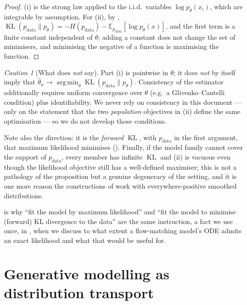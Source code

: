 \documentclass[11pt,a4paper]{report}
\theoremstyle{definition}
\theoremstyle{remark}
\newtheorem{caution}[caution]{Caution}
\DeclareMathOperator*{\argmin}{arg\,min}
\DeclareMathOperator{\KL}{KL}
\newcommand{\EE}{\mathbb E}
\begin{document}
\begin{proof}
(i) is the strong law applied to the i.i.d.\ variables $\log p_\theta(x_i)$,
which are integrable by assumption. For (ii), by
,
$\KL(p_{\mathrm{data}}\|p_\theta) = -H(p_{\mathrm{data}}) - \EE_{p_{\mathrm{data}}}[\log p_\theta(x)]$,
and the first term is a finite constant independent of $\theta$; adding a
constant does not change the set of minimisers, and minimising the negative
of a function is maximising the function.
\end{proof}

\begin{caution}[What  does \emph{not} say]
\label{caution:mle-scope}
Part (i) is pointwise in $\theta$; it does \emph{not} by itself imply that
$\hat\theta_n\to\argmin_\theta\KL(p_{\mathrm{data}}\|p_\theta)$. Consistency
of the estimator additionally requires uniform convergence over $\theta$
(e.g.\ a Glivenko--Cantelli condition) plus identifiability. We never rely on
consistency in this document --- only on the statement that the two
\emph{population} objectives in (ii) define the same optimisation --- so we do
not develop those conditions.

Note also the direction: it is the \emph{forward} $\KL$, with
$p_{\mathrm{data}}$ in the first argument, that maximum likelihood minimises
(). Finally, if the model family cannot cover the
support of $p_{\mathrm{data}}$, every member has infinite $\KL$ and (ii) is
vacuous even though the likelihood objective still has a well-defined
maximiser; this is not a pathology of the proposition but a genuine
degeneracy of the setting, and it is one more reason the constructions of
 work with everywhere-positive
smoothed distributions.
\end{caution}

 is why ``fit the model by maximum likelihood'' and ``fit
the model to minimise (forward) KL divergence to the data'' are the same
instruction, a fact we use once, in , when we
discuss to what extent a flow-matching model's ODE admits an exact likelihood
and what that would be useful for.

\section{Generative modelling as distribution transport}
\label{sec:generative-modelling-intro}
\end{document}
